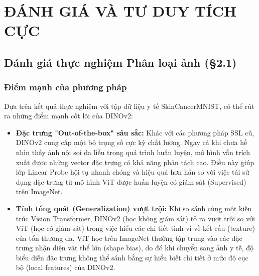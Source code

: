 \chapter{ĐÁNH GIÁ VÀ TƯ DUY TÍCH CỰC}

\section{Đánh giá thực nghiệm Phân loại ảnh (§2.1)}

\subsection{Điểm mạnh của phương pháp}
Dựa trên kết quả thực nghiệm với tập dữ liệu y tế SkinCancerMNIST, có thể rút ra những điểm mạnh cốt lõi của DINOv2:
\begin{itemize}
    \item \textbf{Đặc trưng "Out-of-the-box" sâu sắc:} Khác với các phương pháp SSL cũ, DINOv2 cung cấp một bộ trọng số cực kỳ chất lượng. Ngay cả khi chưa hề nhìn thấy ảnh nội soi da liễu trong quá trình huấn luyện, mô hình vẫn trích xuất được những vector đặc trưng có khả năng phân tách cao. Điều này giúp lớp Linear Probe hội tụ nhanh chóng và hiệu quả hơn hẳn so với việc tái sử dụng đặc trưng từ mô hình ViT được huấn luyện có giám sát (Supervised) trên ImageNet.
    \item \textbf{Tính tổng quát (Generalization) vượt trội:} Khi so sánh cùng một kiến trúc Vision Transformer, DINOv2 (học không giám sát) tỏ ra vượt trội so với ViT (học có giám sát) trong việc hiểu các chi tiết tinh vi về kết cấu (texture) của tổn thương da. ViT học trên ImageNet thường tập trung vào các đặc trưng nhận diện vật thể lớn (shape bias), do đó khi chuyển sang ảnh y tế, độ biểu diễn đặc trưng không thể sánh bằng sự hiểu biết chi tiết ở mức độ cục bộ (local features) của DINOv2.
\end{itemize}

